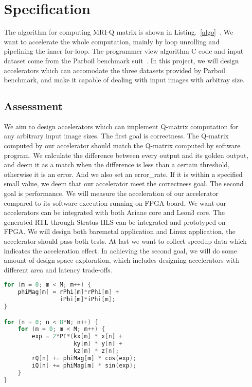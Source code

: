 \section{Specification}
The algorithm for computing MRI-Q matrix is shown in Listing.~\ref{algo}~\cite{stone2008accelerating}. We want to accelerate the whole computation, mainly by loop unrolling and pipelining the inner for-loop. The programmer view algorithm C code and input dataset come from the Parboil benchmark suit~\cite{Rub1}. In this project, we will design accelerators which can accomodate the three datasets provided by Parboil benchmark, and make it capable of dealing with input images with arbitray size.


\subsection{Assessment}
We aim to design accelerators which can implement Q-matrix computation for any arbitrary input image sizes. The first goal is correctness. The Q-matrix computed by our accelerator should match the Q-matrix computed by software program. We calculate the difference between every output and its golden output, and deem it as a match when the difference is less than a certain threshold, otherwise it is an error. And we also set an error\_rate. If it is within a specified small value, we deem that our accelerator meet the correctness goal. The second goal is performance. We will measure the acceleration of our accelerator compared to its software execution running on FPGA board. We want our accelerators can be integrated with both Ariane core and Leon3 core. The generated RTL through Stratus HLS can be integrated and prototyped on FPGA. We will design both baremetal application and Linux application, the accelerator should pass both tests. At last we want to collect speedup data which indicates the acceleration effect. In achieving the second goal, we will do some amount of design space exploration, which includes designing accelerators with different area and latency trade-offs. 

\begin{lstlisting}[language=C, caption=Algorithm for computing MRI Q matrix, label=algo]
for (m = 0; m < M; m++) {
    phiMag[m] = rPhi[m]*rPhi[m] +
                iPhi[m]*iPhi[m];
}

for (n = 0; n < 8*N; n++) {
    for (m = 0; m < M; m++) {
        exp = 2*PI*(kx[m] * x[n] +
                    ky[m] * y[n] +
                    kz[m] * z[n];
        rQ[n] += phiMag[m] * cos(exp);
        iQ[n] += phiMag[m] * sin(exp);
    }
}
\end{lstlisting}

